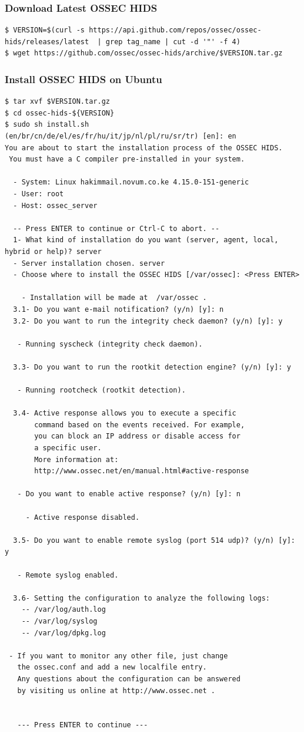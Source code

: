 \documentclass{article}
\begin{document}
\subsubsection{Download Latest OSSEC HIDS}\label{subsubsec:2.1.3}
\begin{verbatim}
$ VERSION=$(curl -s https://api.github.com/repos/ossec/ossec-hids/releases/latest  | grep tag_name | cut -d '"' -f 4)
$ wget https://github.com/ossec/ossec-hids/archive/$VERSION.tar.gz
\end{verbatim}
\subsubsection{Install OSSEC HIDS on Ubuntu}
\begin{verbatim}
$ tar xvf $VERSION.tar.gz
$ cd ossec-hids-${VERSION}
$ sudo sh install.sh
(en/br/cn/de/el/es/fr/hu/it/jp/nl/pl/ru/sr/tr) [en]: en
You are about to start the installation process of the OSSEC HIDS.
 You must have a C compiler pre-installed in your system.

  - System: Linux hakimmail.novum.co.ke 4.15.0-151-generic
  - User: root
  - Host: ossec_server

  -- Press ENTER to continue or Ctrl-C to abort. --
  1- What kind of installation do you want (server, agent, local, hybrid or help)? server
  - Server installation chosen. server
  - Choose where to install the OSSEC HIDS [/var/ossec]: <Press ENTER>

    - Installation will be made at  /var/ossec .
  3.1- Do you want e-mail notification? (y/n) [y]: n
  3.2- Do you want to run the integrity check daemon? (y/n) [y]: y

   - Running syscheck (integrity check daemon).

  3.3- Do you want to run the rootkit detection engine? (y/n) [y]: y

   - Running rootcheck (rootkit detection).

  3.4- Active response allows you to execute a specific
       command based on the events received. For example,
       you can block an IP address or disable access for
       a specific user.
       More information at:
       http://www.ossec.net/en/manual.html#active-response

   - Do you want to enable active response? (y/n) [y]: n

     - Active response disabled.

  3.5- Do you want to enable remote syslog (port 514 udp)? (y/n) [y]: y

   - Remote syslog enabled.

  3.6- Setting the configuration to analyze the following logs:
    -- /var/log/auth.log
    -- /var/log/syslog
    -- /var/log/dpkg.log

 - If you want to monitor any other file, just change
   the ossec.conf and add a new localfile entry.
   Any questions about the configuration can be answered
   by visiting us online at http://www.ossec.net .


   --- Press ENTER to continue ---
\end{verbatim}
\end{document}
